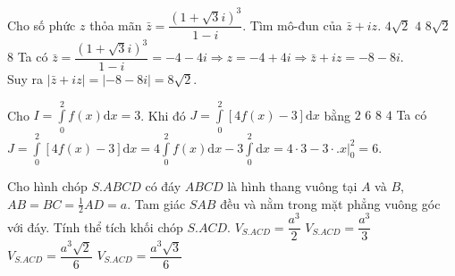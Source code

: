 \begin{ex}%
Cho số phức $z$ thỏa mãn $\bar{z}=\dfrac{\left(1+\sqrt{3}i\right)^3}{1-i}$. Tìm mô-đun của $\bar{z}+iz$.
\choice
{$4\sqrt{2}$}
{$4$}
{\True $8\sqrt{2}$}
{$8$}
\loigiai
{Ta có $\bar{z}=\dfrac{\left(1+\sqrt{3}i\right)^3}{1-i}=-4-4i\Rightarrow z=-4+4i\Rightarrow \bar{z}+iz=-8-8i$.\\Suy ra $\left|\bar{z}+iz\right|=\left|-8-8i\right|=8\sqrt{2}$.}
\end{ex}

\begin{ex}%
Cho $I=\displaystyle\int\limits_0^2f(x)\mathrm{d}x=3$. Khi đó $J=\displaystyle\int\limits_0^2\left[4f(x)-3\right]\mathrm{d}x$ bằng
\choice
{$2$}
{\True $6$}
{$8$}
{$4$}
\loigiai
{Ta có $J=\displaystyle\int\limits_0^2\left[4f(x)-3\right]\mathrm{d}x=4\displaystyle\int\limits_0^2f(x)\mathrm{d}x-3\displaystyle\int\limits_0^2 \mathrm{d}x=4\cdot 3-3\cdot\big. x\big|_0^2=6$.}
\end{ex}

\begin{ex}%
Cho hình chóp $S.ABCD$ có đáy $ABCD$ là hình thang vuông tại $A$ và $B$, $AB=BC=\frac{1}{2}AD=a$. Tam giác $SAB$ đều và nằm trong mặt phẳng vuông góc với đáy. Tính thể tích khối chóp $S.ACD$.
\choice
{$V_{S.ACD} = \dfrac {a^3}{2}$}
{$V_{S.ACD} = \dfrac {a^3}{3}$}
{$V_{S.ACD} = \dfrac {a^3\sqrt {2}}{6}$}
{\True $V_{S.ACD} = \dfrac {a^3\sqrt{3}}{6}$}
\end{ex}

